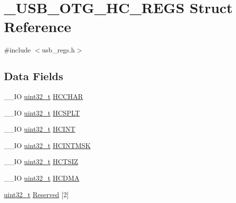 \hypertarget{struct___u_s_b___o_t_g___h_c___r_e_g_s}{\section{\-\_\-\-U\-S\-B\-\_\-\-O\-T\-G\-\_\-\-H\-C\-\_\-\-R\-E\-G\-S Struct Reference}
\label{struct___u_s_b___o_t_g___h_c___r_e_g_s}
}


{\ttfamily \#include $<$usb\-\_\-regs.\-h$>$}

\subsection*{Data Fields}
\begin{DoxyCompactItemize}
\item 
\-\_\-\-\_\-\-I\-O \hyperlink{stdint_8h_a435d1572bf3f880d55459d9805097f62}{uint32\-\_\-t} \hyperlink{group___u_s_b___o_t_g___d_r_i_v_e_r_gac3ad21de95d63e9a2d419ccea2df38f4}{H\-C\-C\-H\-A\-R}
\item 
\-\_\-\-\_\-\-I\-O \hyperlink{stdint_8h_a435d1572bf3f880d55459d9805097f62}{uint32\-\_\-t} \hyperlink{group___u_s_b___o_t_g___d_r_i_v_e_r_ga25824318899e3094e96b30151084a6c3}{H\-C\-S\-P\-L\-T}
\item 
\-\_\-\-\_\-\-I\-O \hyperlink{stdint_8h_a435d1572bf3f880d55459d9805097f62}{uint32\-\_\-t} \hyperlink{group___u_s_b___o_t_g___d_r_i_v_e_r_ga10ac581956332a3dca2b9ba7ea05230f}{H\-C\-I\-N\-T}
\item 
\-\_\-\-\_\-\-I\-O \hyperlink{stdint_8h_a435d1572bf3f880d55459d9805097f62}{uint32\-\_\-t} \hyperlink{group___u_s_b___o_t_g___d_r_i_v_e_r_ga2dbe5f6d3aa6e195d2aaeb0bc2065d24}{H\-C\-I\-N\-T\-M\-S\-K}
\item 
\-\_\-\-\_\-\-I\-O \hyperlink{stdint_8h_a435d1572bf3f880d55459d9805097f62}{uint32\-\_\-t} \hyperlink{group___u_s_b___o_t_g___d_r_i_v_e_r_gaece38f0014a78ca60398f474dea5a3d0}{H\-C\-T\-S\-I\-Z}
\item 
\-\_\-\-\_\-\-I\-O \hyperlink{stdint_8h_a435d1572bf3f880d55459d9805097f62}{uint32\-\_\-t} \hyperlink{group___u_s_b___o_t_g___d_r_i_v_e_r_ga31e582ea1e15069538505cfcfa13f9f2}{H\-C\-D\-M\-A}
\item 
\hyperlink{stdint_8h_a435d1572bf3f880d55459d9805097f62}{uint32\-\_\-t} \hyperlink{group___u_s_b___o_t_g___d_r_i_v_e_r_ga86ff2db88b93c1f102a1cfabc608c2ab}{Reserved} \mbox{[}2\mbox{]}
\end{DoxyCompactItemize}


